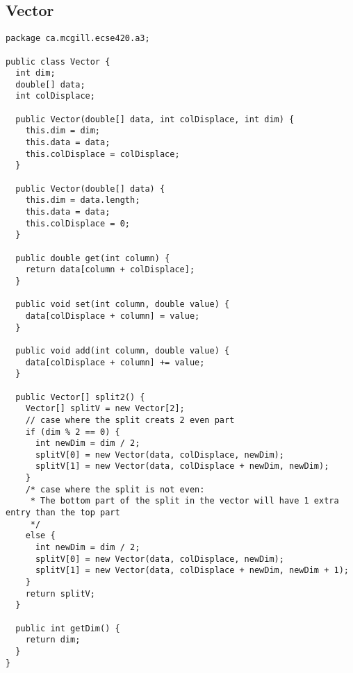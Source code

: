 \documentclass[11pt,letterpaper]{exam}
\begin{document}
    \subsection{Vector}
	\begin{lstlisting}
package ca.mcgill.ecse420.a3;

public class Vector {
  int dim;
  double[] data;
  int colDisplace;

  public Vector(double[] data, int colDisplace, int dim) {
    this.dim = dim;
    this.data = data;
    this.colDisplace = colDisplace;
  }

  public Vector(double[] data) {
    this.dim = data.length;
    this.data = data;
    this.colDisplace = 0;
  }

  public double get(int column) {
    return data[column + colDisplace];
  }

  public void set(int column, double value) {
    data[colDisplace + column] = value;
  }

  public void add(int column, double value) {
    data[colDisplace + column] += value;
  }

  public Vector[] split2() {
    Vector[] splitV = new Vector[2];
    // case where the split creats 2 even part
    if (dim % 2 == 0) {
      int newDim = dim / 2;
      splitV[0] = new Vector(data, colDisplace, newDim);
      splitV[1] = new Vector(data, colDisplace + newDim, newDim);
    }
    /* case where the split is not even:
     * The bottom part of the split in the vector will have 1 extra entry than the top part
     */
    else {
      int newDim = dim / 2;
      splitV[0] = new Vector(data, colDisplace, newDim);
      splitV[1] = new Vector(data, colDisplace + newDim, newDim + 1);
    }
    return splitV;
  }

  public int getDim() {
    return dim;
  }
}
	\end{lstlisting}
\end{document}
